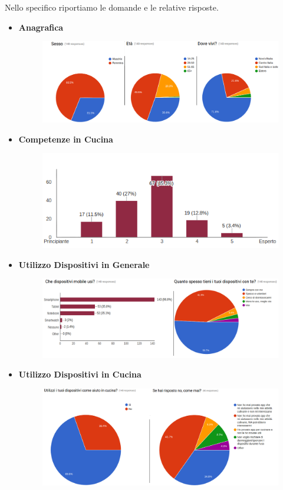 Nello specifico riportiamo le domande e le relative risposte.
\begin{itemize}
	\item\textbf{Anagrafica}
		\begin{figure} [H]	
			\centering
			\includegraphics[width=\textwidth]{img/survey-123.png}
		\end{figure}
	\item\textbf{Competenze in Cucina}
		\begin{figure} [H]	
			\centering
			\includegraphics[scale=0.65]{img/survey-4.png}
		\end{figure}
	\item\textbf{Utilizzo Dispositivi in Generale}
		\begin{figure} [H]	
			\centering
			\includegraphics[scale=0.45]{img/survey-56.png}
		\end{figure}
	\item\textbf{Utilizzo Dispositivi in Cucina}
		\begin{figure} [H]
			\centering
			\includegraphics[scale=0.40]{img/survey-78.png}
		\end{figure}
		

\end{itemize}

